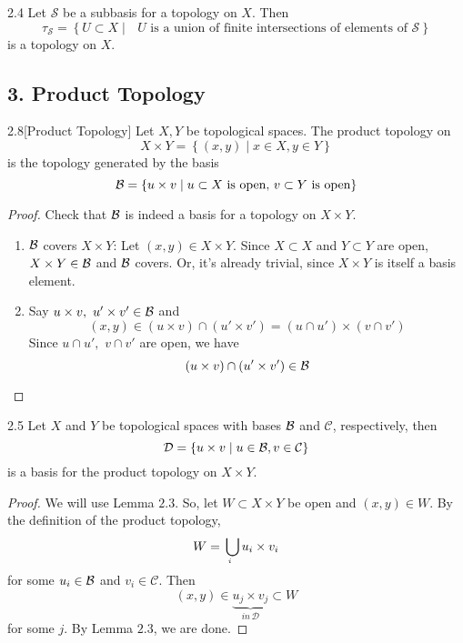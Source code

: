 \begin{customlemma}{2.4}
Let $\mathcal{S}$ be a subbasis for a topology on $X$. Then 
$$\tau_{\mathcal{S}} = \left\{U \subset X \mid \text{ $U$ is a union of finite intersections of elements of $\mathcal{S}$}\right\}$$
is a topology on $X$.
\end{customlemma}

\subsection*{3. Product Topology}

\begin{customdefinition}{2.8}[Product Topology]
Let $X, Y$ be topological spaces. The product topology on 
$$X \times Y = \left\{(x,y) \mid x\in X, y\in Y\right\}$$
is the topology generated by the basis 
$$\mathcal{B} = \left\{u \times v \mid u \subset X \text{ is open, } v\subset Y \text{ is open}\right\}$$
\end{customdefinition}

\begin{proof}
Check that $\mathcal{B}$ is indeed a basis for a topology on $X\times Y$.
\begin{enumerate}
    \item[1).] $\mathcal{B}$ covers $X \times Y$: Let $(x, y) \in X \times Y$. Since $X \subset X$ and $Y \subset Y$ are open, $X \times Y \in \mathcal{B}$ and $\mathcal{B}$ covers. Or, it's already trivial, since $X \times Y$ is itself a basis element.
    \item[2).] Say $u \times v, \,\, u' \times v' \in \mathcal{B}$ and 
                $$(x, y) \in (u\times v) \cap (u' \times v') = (u \cap u') \times (v \cap v')$$
                Since $u \cap u',\,\, v \cap v'$ are open, we have
                $$(u\times v) \cap (u' \times v') \in \mathcal{B}$$
\end{enumerate} 
\end{proof}

\begin{customthm}{2.5}
Let $X$ and $Y$ be topological spaces with bases $\mathcal{B}$ and $\mathcal{C}$, respectively, then 
    $$\mathcal{D} = \left\{u\times v\mid u\in \mathcal{B}, v \in \mathcal{C}\right\}$$
    is a basis for the product topology on $X \times Y$.
\end{customthm}

\begin{proof}
We will use Lemma $2.3$. So, let $W \subset X \times Y$ be open and $(x,y) \in W$. By the definition of the product topology,
$$W = \underaccent{i}{\bigcup} u_i \times v_i$$
for some $u_i \in \mathcal{B}$ and $v_i \in \mathcal{C}$. Then 
$$(x, y) \in \underbrace{u_j \times v_j}_{in \,\mathcal{D}} \subset W$$
for some $j$. By Lemma $2.3$, we are done.
\end{proof}

